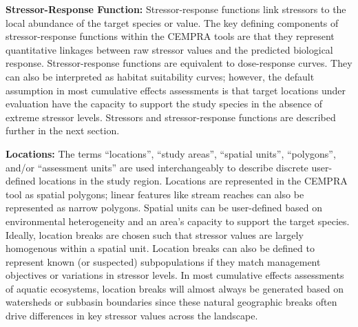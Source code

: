 \documentclass[
  letterpaper,
  DIV=11,
  numbers=noendperiod]{scrreprt}
\begin{document}
\textbf{Stressor-Response Function:} Stressor-response functions link
stressors to the local abundance of the target species or value. The key
defining components of stressor-response functions within the CEMPRA
tools are that they represent quantitative linkages between raw stressor
values and the predicted biological response. Stressor-response
functions are equivalent to dose-response curves. They can also be
interpreted as habitat suitability curves; however, the default
assumption in most cumulative effects assessments is that target
locations under evaluation have the capacity to support the study
species in the absence of extreme stressor levels. Stressors and
stressor-response functions are described further in the next section.

\textbf{Locations:} The terms ``locations'', ``study areas'', ``spatial
units'', ``polygons'', and/or ``assessment units'' are used
interchangeably to describe discrete user-defined locations in the study
region. Locations are represented in the CEMPRA tool as spatial
polygons; linear features like stream reaches can also be represented as
narrow polygons. Spatial units can be user-defined based on
environmental heterogeneity and an area's capacity to support the target
species. Ideally, location breaks are chosen such that stressor values
are largely homogenous within a spatial unit. Location breaks can also
be defined to represent known (or suspected) subpopulations if they
match management objectives or variations in stressor levels. In most
cumulative effects assessments of aquatic ecosystems, location breaks
will almost always be generated based on watersheds or subbasin
boundaries since these natural geographic breaks often drive differences
in key stressor values across the landscape.
\end{document}
